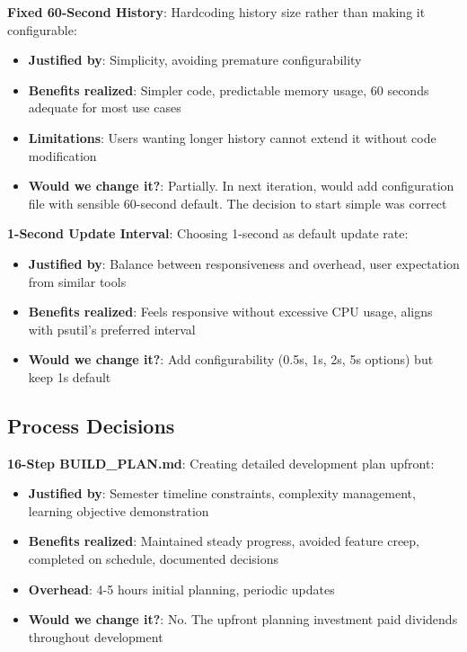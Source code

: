 \documentclass[12pt,a4paper,oneside]{report}
\begin{document}
\textbf{Fixed 60-Second History}: Hardcoding history size rather than making it configurable:

\begin{itemize}
    \item \textbf{Justified by}: Simplicity, avoiding premature configurability
    \item \textbf{Benefits realized}: Simpler code, predictable memory usage, 60 seconds adequate for most use cases
    \item \textbf{Limitations}: Users wanting longer history cannot extend it without code modification
    \item \textbf{Would we change it?}: Partially. In next iteration, would add configuration file with sensible 60-second default. The decision to start simple was correct
\end{itemize}

\textbf{1-Second Update Interval}: Choosing 1-second as default update rate:

\begin{itemize}
    \item \textbf{Justified by}: Balance between responsiveness and overhead, user expectation from similar tools
    \item \textbf{Benefits realized}: Feels responsive without excessive CPU usage, aligns with psutil's preferred interval
    \item \textbf{Would we change it?}: Add configurability (0.5s, 1s, 2s, 5s options) but keep 1s default
\end{itemize}

\subsection{Process Decisions}

\textbf{16-Step BUILD\_PLAN.md}: Creating detailed development plan upfront:

\begin{itemize}
    \item \textbf{Justified by}: Semester timeline constraints, complexity management, learning objective demonstration
    \item \textbf{Benefits realized}: Maintained steady progress, avoided feature creep, completed on schedule, documented decisions
    \item \textbf{Overhead}: 4-5 hours initial planning, periodic updates
    \item \textbf{Would we change it?}: No. The upfront planning investment paid dividends throughout development
\end{itemize}
\end{document}
